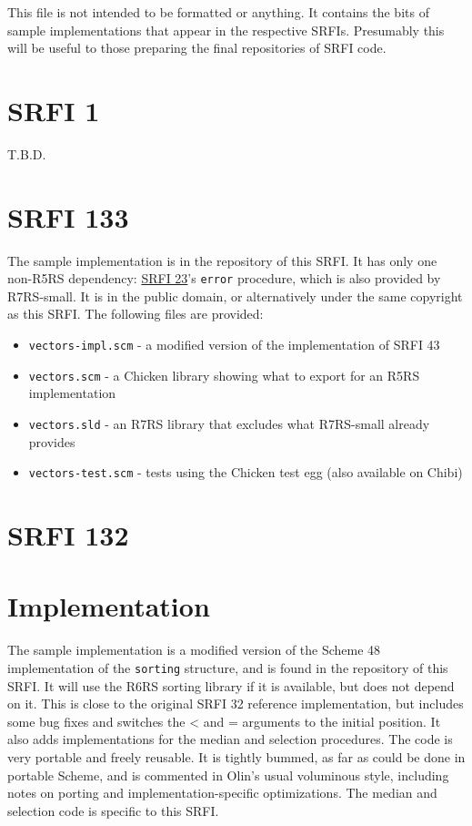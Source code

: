 This file is not intended to be formatted or anything. It contains
the bits of sample implementations that appear in the respective
SRFIs. Presumably this will be useful to those preparing the final
repositories of SRFI code.

\section{SRFI 1}

T.B.D.

\section{SRFI 133}



The sample implementation is in the repository of this SRFI. It has only
one non-R5RS dependency: \protect\hyperlink{SRFI-23}{SRFI 23}'s
\texttt{error} procedure, which is also provided by R7RS-small. It is in
the public domain, or alternatively under the same copyright as this
SRFI. The following files are provided:

\begin{itemize}
\tightlist
\item
  \texttt{vectors-impl.scm} - a modified version of the implementation
  of SRFI 43
\item
  \texttt{vectors.scm} - a Chicken library showing what to export for an
  R5RS implementation
\item
  \texttt{vectors.sld} - an R7RS library that excludes what R7RS-small
  already provides
\item
  \texttt{vectors-test.scm} - tests using the Chicken test egg (also
  available on Chibi)
\end{itemize}

\section{SRFI 132}
\section{Implementation}\label{implementation}

The sample implementation is a modified version of the Scheme 48
implementation of the \texttt{sorting} structure, and is found in the
repository of this SRFI. It will use the R6RS sorting library if it is
available, but does not depend on it. This is close to the original SRFI
32 reference implementation, but includes some bug fixes and switches
the \textless{} and = arguments to the initial position. It also adds
implementations for the median and selection procedures. The code is
very portable and freely reusable. It is tightly bummed, as far as could
be done in portable Scheme, and is commented in Olin's usual voluminous
style, including notes on porting and implementation-specific
optimizations. The median and selection code is specific to this SRFI.

